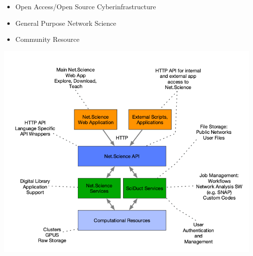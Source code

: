 \documentclass[landscape,paperwidth=70in,paperheight=46in,fontscale=0.225]{baposter} %
\begin{document}
\begin{poster}
{\begin{minipage}{.4\textwidth}
\begin{itemize}[leftmargin=*,noitemsep,topsep=0pt]
\item Open Access/Open Source Cyberinfrastructure
\item General Purpose Network Science
\item Community Resource
\end{itemize}
\end{minipage}
\hfill
\begin{minipage}{.6\textwidth}
\begin{center}
\includegraphics[scale=0.25]{figures/sys_descr.png}
\end{center}
\end{minipage}

}


\end{poster}
\end{document}
